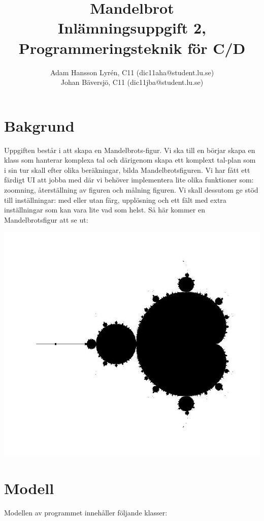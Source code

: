 \documentclass[a4paper]{article}
\title{Mandelbrot \\
	Inlämningsuppgift 2, Programmeringsteknik för C/D}
\author{Adam Hansson Lyrén, C11 (dic11aha@student.lu.se)\\
Johan Bäversjö, C11 (dic11jba@student.lu.se)}
\begin{document}

\maketitle
\thispagestyle{empty}
\newpage
\setcounter{page}{1}
\section{Bakgrund}
Uppgiften består i att skapa en Mandelbrots-figur. Vi ska till en börjar skapa en klass som hanterar komplexa tal och därigenom skapa ett komplext tal-plan som i sin tur skall efter olika beräkningar, bilda Mandelbrotsfiguren. Vi har fått ett färdigt UI att jobba med där vi behöver implementera lite olika funktioner som: zoomning, återställning av figuren och målning figuren.
\newline
Vi skall dessutom ge stöd till inställningar: med eller utan färg, upplösning och ett fält med extra inställningar som kan vara lite vad som helst.
\newline
\newline
Så här kommer en Mandelbrotsfigur att se ut:
\begin{center}
\includegraphics[scale=0.29]{mandelbrot_print_1.jpg}
\end{center}
 
\section{Modell}
Modellen av programmet innehåller följande klasser:
\end{document}
